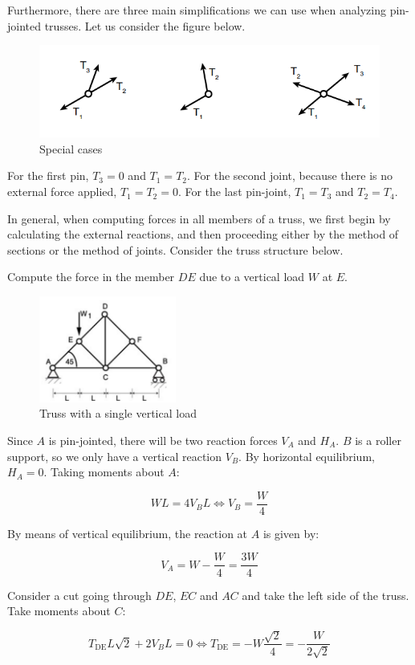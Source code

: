 \documentclass{article}
\begin{document}
Furthermore, there are three main simplifications we can use when analyzing pin-jointed trusses. Let us consider the figure below.

\begin{figure}[h]
    \centering
    \includegraphics{images/truss4.png}
    \caption{Special cases}
    \label{fig:enter-label}
\end{figure}

For the first pin, $T_3 = 0$ and $T_1 = T_2$. For the second joint, because there is no external force applied, $T_1 = T_2 = 0$. For the last pin-joint, $T_1 = T_3$ and $T_2 = T_4$.

In general, when computing forces in all members of a truss, we first begin by calculating the external reactions, and then proceeding either by the method of sections or the method of joints. Consider the truss structure below.

\begin{example}
    Compute the force in the member $DE$ due to a vertical load $W$ at $E$.

    \begin{figure}[h]
    \centering
    \includegraphics[width = 0.4\textwidth]{images/truss5.png}
    \caption{Truss with a single vertical load}
    \label{fig:enter-label}
    \end{figure}

    Since $A$ is pin-jointed, there will be two reaction forces $V_A$ and $H_A$. $B$ is a roller support, so we only have a vertical reaction $V_B$. By horizontal equilibrium, $H_A = 0$. Taking moments about $A$:

    \[ WL = 4V_BL \iff V_B = \frac{W}{4} \]
 
    By means of vertical equilibrium, the reaction at $A$ is given by:

    \[ V_A = W - \frac{W}{4} = \frac{3W}{4} \]

    Consider a cut going through $DE$, $EC$ and $AC$ and take the left side of the truss. Take moments about $C$:

    \[ T_{\text{DE}} L\sqrt{2} + 2V_BL = 0 \iff T_{\text{DE}} = -W\frac{\sqrt{2}}{4} = -\frac{W}{2\sqrt{2}} \]
\end{example}
\end{document}
